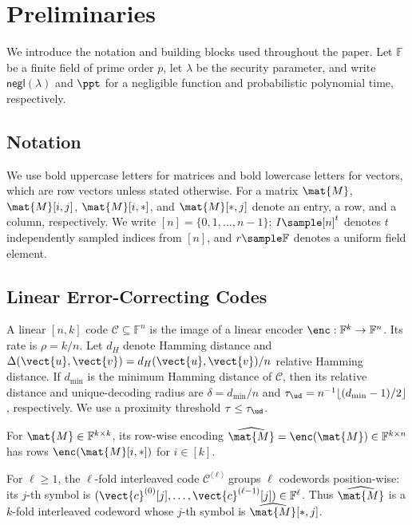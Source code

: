 \section{Preliminaries}
\label{sec:prelim}

We introduce the notation and building blocks used throughout the paper.  Let
$\mathbb{F}$ be a finite field of prime order $p$, let $\lambda$ be the
security parameter, and write $\textsf{negl}(\lambda)$ and $\ppt$ for a
negligible function and probabilistic polynomial time, respectively.

\subsection{Notation}
\label{sec:notation}

We use bold uppercase letters for matrices and bold lowercase letters for
vectors, which are row vectors unless stated otherwise.  For a matrix
$\mat{M}$, $\mat{M}[i,j]$, $\mat{M}[i,*]$, and $\mat{M}[*,j]$ denote an entry,
a row, and a column, respectively.  We write $[n]=\{0,1,\ldots,n-1\}$;
$I\sample[n]^t$ denotes $t$ independently sampled indices from $[n]$, and
$r\sample\mathbb{F}$ denotes a uniform field element.

\subsection{Linear Error-Correcting Codes}
\label{sec:prelim-codes}

A linear $[n,k]$ code $\mathcal{C}\subseteq\mathbb{F}^n$ is the image of a
linear encoder $\enc:\mathbb{F}^k\to\mathbb{F}^n$.  Its rate is
$\rho=k/n$.  Let $d_H$ denote Hamming distance and
$\Delta(\vect{u},\vect{v})=d_H(\vect{u},\vect{v})/n$ relative Hamming
distance.  If $d_{\min}$ is the minimum Hamming distance of $\mathcal{C}$,
then its relative distance and unique-decoding radius are
$\delta=d_{\min}/n$ and
$\tau_\ud=n^{-1}\lfloor(d_{\min}-1)/2\rfloor$, respectively.  We use a
proximity threshold $\tau\leq\tau_\ud$.

For $\mat{M}\in\mathbb{F}^{k\times k}$, its row-wise encoding
$\widehat{\mat{M}}=\enc(\mat{M})\in\mathbb{F}^{k\times n}$ has rows
$\enc(\mat{M}[i,*])$ for $i\in[k]$.

\begin{definition}\label{def:interleaved-code}
For $\ell\geq1$, the $\ell$-fold interleaved code
$\mathcal{C}^{\langle\ell\rangle}$ groups $\ell$ codewords position-wise:
its $j$-th symbol is
$(\vect{c}^{(0)}[j],\ldots,\vect{c}^{(\ell-1)}[j])\in\mathbb{F}^{\ell}$.
Thus $\widehat{\mat{M}}$ is a $k$-fold interleaved codeword whose $j$-th
symbol is $\widehat{\mat{M}}[*,j]$.
\end{definition}

